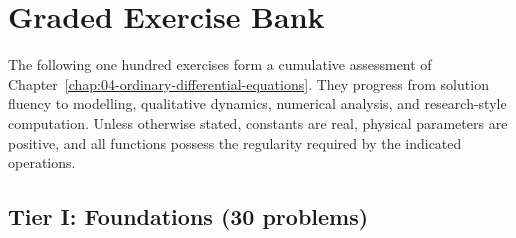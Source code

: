 \section{Graded Exercise Bank}
\label{sec:ch4-exercises}

The following one hundred exercises form a cumulative assessment of Chapter~\ref{chap:04-ordinary-differential-equations}. They progress from solution fluency to modelling, qualitative dynamics, numerical analysis, and research-style computation. Unless otherwise stated, constants are real, physical parameters are positive, and all functions possess the regularity required by the indicated operations.

\subsection*{Tier I: Foundations (30 problems)}
